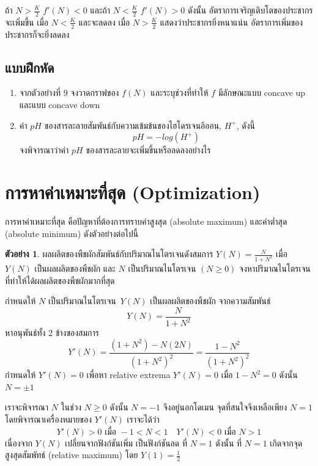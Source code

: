 \documentclass[
]{book}
\theoremstyle{definition}
\theoremstyle{definition}
\newtheorem{example}{ตัวอย่าง}[chapter]
\theoremstyle{definition}
\theoremstyle{definition}
\theoremstyle{remark}
\begin{document}
ถ้า \(\displaystyle N> \frac{K}{2}\) \(f'(N)<0\) และถ้า
\(\displaystyle N< \frac{K}{2}\) \(f'(N)>0\) ดังนั้น
อัตราการเจริญเติบโตของประชากรจะเพิ่มขึ้น เมื่อ \(\displaystyle N< \frac{K}{2}\)
และจะลดลง เมื่อ \(\displaystyle N> \frac{K}{2}\) แสดงว่าประชากรยิ่งหนาแน่น
อัตราการเพิ่มของประชากรก็จะยิ่งลดลง

\subsection{แบบฝึกหัด}\label{uxe41uxe1auxe1auxe1duxe01uxe2buxe14-5}

\begin{enumerate}
\def\labelenumi{\arabic{enumi}.}
\item
  จากตัวอย่างที่ 9 จงวาดกราฟของ \(f(N)\) และระบุช่วงที่ทำให้ \(f\) มีลักษณะแบบ
  concave up และแบบ concave down
\item
  ค่า \(pH\) ของสารละลายสัมพันธ์กับความเข้มข้นของไฮโดรเจนอิออน, \(H^+\), ดังนี้
  \[pH=-log(H^+)\] จงพิจารณาว่าค่า \(pH\) ของสารละลายจะเพิ่มขึ้นหรือลดลงอย่างไร
\end{enumerate}

\section{การหาค่าเหมาะที่สุด (Optimization)}\label{uxe01uxe32uxe23uxe2buxe32uxe04uxe32uxe40uxe2buxe21uxe32uxe30uxe17uxe2auxe14-optimization}

การหาค่าเหมาะที่สุด คือปัญหาที่ต้องการทราบค่าสูงสุด (absolute maximum) และค่าต่ำสุด
(absolute minimum) ดังตัวอย่างต่อไปนี้

\begin{example}
ผลผลิตของพืชผักสัมพันธ์กับปริมาณไนโตรเจนดังสมการ
\(\displaystyle Y(N)= \frac{N}{1+N^2}\) เมื่อ \(Y(N)\) เป็นผลผลิตของพืชผัก และ \(N\)
เป็นปริมาณไนโตรเจน \((N \ge 0)\) จงหาปริมาณไนโตรเจนที่ทำให้ได้ผลผลิตของพืชผักมากที่สุด
\end{example}

กำหนดให้ \(N\) เป็นปริมาณไนโตรเจน~\(Y(N)\) เป็นผลผลิตของพืชผัก จากความสัมพันธ์
\[Y(N)= \frac{N}{1+N^2}\] หาอนุพันธ์ทั้ง 2 ข้างของสมการ
\[Y'(N)= \frac{(1+N^2)-N(2N)}{(1+N^2)^2}= \frac{1-N^2}{(1+N^2)^2}\]
กำหนดให้ \(Y'(N)=0\) เพื่อหา relative extrema \(Y'(N)=0\) เมื่อ \(1-N^2=0\) ดังนั้น
\(N= \pm 1\)

เราจะพิจารณา \(N\) ในช่วง \(N \ge 0\) ดังนั้น \(N=-1\) จึงอยู่นอกโดเมน
จุดที่สนใจจึงเหลือเพียง \(N=1\) โดยพิจารณาเครื่องหมายของ \(Y'(N)\) เราจะได้ว่า
\[Y'(N) > 0 \text{ เมื่อ }  -1< N <1  \quad  Y'(N) < 0 \text{ เมื่อ } N > 1\]
เนื่องจาก \(Y(N)\) เปลี่ยนจากฟังก์ชันเพิ่ม เป็นฟังก์ชันลด ที่ \(N=1\) ดังนั้น ที่ \(N=1\)
เกิดจากจุดสูงสุดสัมพัทธ์ (relative maximum) โดย \(Y(1)= \frac{1}{2}\)
\end{document}
